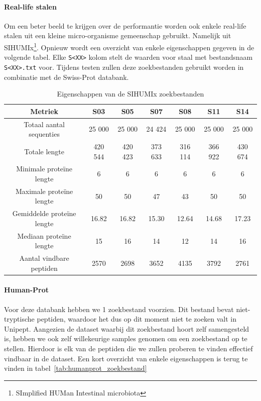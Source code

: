 \documentclass[11pt,dutch,faculty=we,layout=titlefont,underline=false,titleUppercase=true,titleUnderline=true]{ugent2016-report}
\begin{document}
    \paragraph{Real-life stalen}
    Om een beter beeld te krijgen over de performantie worden ook enkele real-life stalen uit een kleine micro-organisme gemeenschap gebruikt.
    Namelijk uit SIHUMIx\footnote{SImplified HUMan Intestinal microbiota}\cite{SIHUMI_first_introduction, SIHUMI_frequently_used}.
    Opnieuw wordt een overzicht van enkele eigenschappen gegeven in de volgende tabel.
    Elke \texttt{S<XX>} kolom stelt de waarden voor staal met bestandsnaam \texttt{S<XX>.txt} voor.
    Tijdens testen zullen deze zoekbestanden gebruikt worden in combinatie met de Swiss-Prot databank.

    \begin{table}[h!]
        \centering
        \begin{tabular}{ c c c c c c c }
            Metriek                    & S03     & S05     & S07     & S08     & S11     & S14     \\
            \hline\hline
            Totaal aantal sequenties   & 25 000  & 25 000  & 24 424  & 25 000  & 25 000  & 25 000  \\
            Totale lengte              & 420 544 & 420 423 & 373 633 & 316 114 & 366 922 & 430 674 \\
            Minimale proteïne lengte   & 6       & 6       & 6       & 6       & 6       & 6       \\
            Maximale proteïne lengte   & 50      & 50      & 47      & 43      & 50      & 50      \\
            Gemiddelde proteïne lengte & 16.82   & 16.82   & 15.30   & 12.64   & 14.68   & 17.23   \\
            Mediaan proteïne lengte    & 15      & 16      & 14      & 12      & 14      & 16      \\
            Aantal vindbare peptiden   & 2570    & 2698    & 3652    & 4135    & 3792    & 2761    \\
            \hline
        \end{tabular}
        \caption{Eigenschappen van de SIHUMIx zoekbestanden}
        \label{tab:sihumi_zoekbestanden}
    \end{table}

    \paragraph{Human-Prot} Voor deze databank hebben we 1 zoekbestand voorzien.
    Dit bestand bevat niet-tryptische peptiden, waardoor het dus op dit moment niet te zoeken valt in Unipept.
    Aangezien de dataset waarbij dit zoekbestand hoort zelf samengesteld is, hebben we ook zelf willekeurige samples genomen om een zoekbestand op te stellen.
    Hierdoor is elk van de peptiden die we zullen proberen te vinden effectief vindbaar in de dataset.
    Een kort overzicht van enkele eigenschappen is terug te vinden in tabel~\ref{tab:humanprot_zoekbestand}
\end{document}
